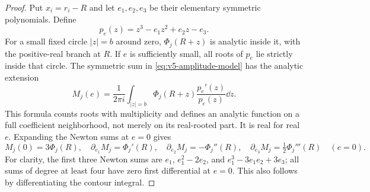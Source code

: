 \begin{proof}
Put $x_i=r_i-R$ and let $e_1,e_2,e_3$ be their elementary symmetric
polynomials. Define
\[
 p_e(z)=z^3-e_1z^2+e_2z-e_3.
\]
For a small fixed circle $|z|=b$ around zero, $\Phi_j(R+z)$ is analytic
inside it, with the positive-real branch at $R$. If $e$ is sufficiently
small, all roots of $p_e$ lie strictly inside that circle. The symmetric
sum in \eqref{eq:v5-amplitude-model} has the analytic extension
\begin{equation}\label{eq:v5-contour}
 M_j(e)=\frac1{2\pi i}\int_{|z|=b}
             \Phi_j(R+z)\frac{p_e'(z)}{p_e(z)}\dd z.
\end{equation}
This formula counts roots with multiplicity and defines an analytic
function on a full coefficient neighborhood, not merely on its
real-rooted part. It is real for real $e$. Expanding the Newton sums at
$e=0$ gives
\begin{equation}\label{eq:v5-symmetric-jets}
 M_j(0)=3\Phi_j(R),\quad
 \partial_{e_1}M_j=\Phi_j'(R),\quad
 \partial_{e_2}M_j=-\Phi_j''(R),\quad
 \partial_{e_3}M_j=\tfrac12\Phi_j'''(R)
 \quad(e=0).
\end{equation}
For clarity, the first three Newton sums are
$e_1$, $e_1^2-2e_2$, and $e_1^3-3e_1e_2+3e_3$; all sums of degree
at least four have zero first differential at $e=0$. This also follows
by differentiating the contour integral.


\end{proof}
